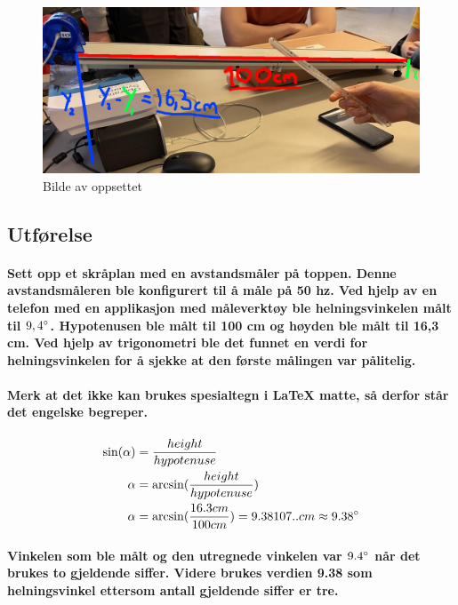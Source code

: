 \documentclass[12pt]{article}
\begin{document}
\begin{figure}[htp]
    \centering
    \includegraphics[width=14cm]{oppsett.jpg}
    \caption{Bilde av oppsettet}
    \label{fig:oppsett}
\end{figure}

\subsection{Utførelse}
\paragraph{Sett opp et skråplan med en avstandsmåler på toppen. Denne avstandsmåleren ble konfigurert til å måle på 50 hz. Ved hjelp av en telefon med en applikasjon med måleverktøy ble helningsvinkelen målt til $9,4\degree$. Hypotenusen ble målt til 100 cm og høyden ble målt til 16,3 cm. Ved hjelp av trigonometri ble det funnet en verdi for helningsvinkelen for å sjekke at den første målingen var pålitelig.}

\paragraph{Merk at det ikke kan brukes spesialtegn i LaTeX matte, så derfor står det \newline engelske begreper.}
\begin{align*}
    \sin(\alpha) &= \frac{height}{hypotenuse} \\
    \alpha &= \arcsin(\frac{height}{hypotenuse}) \\
    \alpha &= \arcsin(\frac{16.3 cm}{100 cm}) = 9.38107.. cm \approx 9.38 \degree \\
\end{align*}

\paragraph{Vinkelen som ble målt og den utregnede vinkelen var $9.4\degree$ når det brukes to gjeldende siffer. Videre brukes verdien 9.38 \degree som helningsvinkel ettersom antall gjeldende siffer er tre.}
\end{document}
